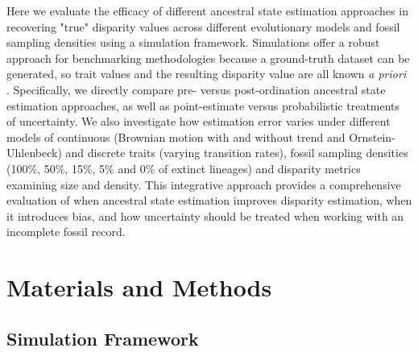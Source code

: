 \documentclass[11pt, a4paper]{article}
\newcommand{\ase}{ancestral state estimation }
\begin{document}
Here we evaluate the efficacy of different \ase approaches in recovering "true" disparity values across different evolutionary models and fossil sampling densities using a simulation framework.
Simulations offer a robust approach for benchmarking methodologies because a ground-truth dataset can be generated, so trait values and the resulting disparity value are all known \textit{a priori} \citep{lotterhos2022simulation}.
Specifically, we directly compare pre- versus post-ordination ancestral state estimation approaches, as well as point-estimate versus probabilistic treatments of uncertainty.
We also investigate how estimation error varies under different models of continuous (Brownian motion with and without trend and Ornstein-Uhlenbeck) and discrete traits (varying transition rates), fossil sampling densities (100\%, 50\%, 15\%, 5\% and 0\% of extinct lineages) and disparity metrics examining size and density.
This integrative approach provides a comprehensive evaluation of when \ase improves disparity estimation, when it introduces bias, and how uncertainty should be treated when working with an incomplete fossil record.

\section{Materials and Methods}

\subsection{Simulation Framework}
\end{document}
